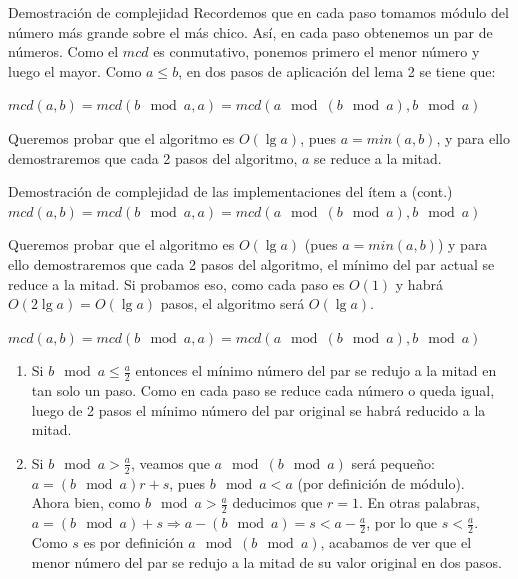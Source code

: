 \documentclass[compress]{beamer}
\newcommand{\tabu}{\hspace*{0.7cm}}
\begin{document}
\begin{frame}{Demostraci\'on de complejidad}
Recordemos que en cada paso tomamos m\'odulo del n\'umero m\'as grande sobre el m\'as chico. As\'i, en cada paso obtenemos un par de n\'umeros. Como el $mcd$ es conmutativo, ponemos primero el menor n\'umero y luego el mayor. Como $a \leq b$, en dos pasos de aplicaci\'on del lema 2 se tiene que: \\ \bigskip

$mcd(a,b) = mcd(b \mod{a}, a) = mcd(a \mod{(b \mod{a})}, b \mod{a})$ \\ \bigskip

Queremos probar que el algoritmo es $O(\lg a)$, pues $a = min(a,b)$, y para ello demostraremos que cada 2 pasos del algoritmo, $a$ se reduce a la mitad.
\end{frame}

\begin{frame}{Demostraci\'on de complejidad de las implementaciones del \'item a (cont.)}
$mcd(a,b) = mcd(b \mod{a}, a) = mcd(a \mod{(b \mod{a})}, b \mod{a})$ \\ \bigskip

Queremos probar que el algoritmo es $O(\lg a)$ (pues $a = min(a,b)$) y para ello demostraremos que cada 2 pasos del algoritmo, el m\'inimo del par actual se reduce a la mitad. Si probamos eso, como cada paso es $O(1)$ y habr\'a $O(2\lg a) = O(\lg a)$ pasos, el algoritmo ser\'a $O(\lg a)$.\\ \bigskip

\end{frame}

\begin{frame}
$mcd(a,b) = mcd(b \mod{a}, a) = mcd(a \mod{(b \mod{a})}, b \mod{a})$ \\ \bigskip

\begin{enumerate}
\item Si $b \mod{a} \leq \frac{a}{2}$ entonces el m\'inimo n\'umero del par se redujo a la mitad en tan solo un paso. Como en cada paso se reduce cada n\'umero o queda igual, luego de 2 pasos el m\'inimo n\'umero del par original se habr\'a reducido a la mitad.
\item Si $b \mod{a} > \frac{a}{2}$, veamos que $a \mod{(b \mod{a})}$ ser\'a peque\~no: \\
\tabu \tabu $a = (b \mod{a})r + s$, pues $b \mod{a} < a$ (por definici\'on de m\'odulo). \\

Ahora bien, como $b \mod{a} > \frac{a}{2}$ deducimos que $r = 1$. En otras palabras, $a = (b \mod{a}) + s \Rightarrow a - (b \mod{a}) = s < a - \frac{a}{2}$, por lo que $s < \frac{a}{2}$. 
Como $s$ es por definici\'on $a \mod{(b \mod{a})}$, acabamos de ver que el menor n\'umero del par se redujo a la mitad de su valor original en dos pasos.
\end{enumerate}

\end{frame}
\end{document}
